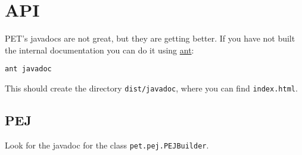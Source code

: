
\chapter{API}

PET's javadocs are not great, but they are getting better.
If you have not built the internal documentation you can do it using \href{http://ant.apache.org/}{ant}:

\begin{lstlisting}[style=BashStyle]
ant javadoc
\end{lstlisting}

This should create the directory \texttt{dist/javadoc}, where you can find \texttt{index.html}.

\section{PEJ}

Look for the javadoc for the class \texttt{pet.pej.PEJBuilder}.